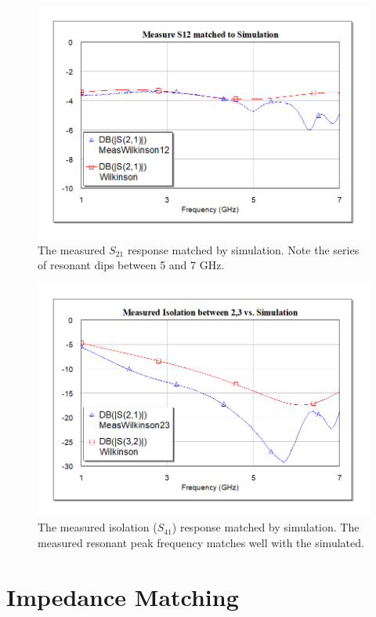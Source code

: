 \documentclass[twocolumn, aps, apl]{revtex4-1}
\begin{document}
\begin{figure}[!htbp]
    \centering
    \includegraphics[scale=0.4]{WilkinsonThro.png}
    \caption{The measured $S_{21}$ response matched by simulation. Note the series of resonant dips between 5 and 7 GHz. }
    \label{fig:wilkthro}
\end{figure}

\begin{figure}[!htbp]
    \centering
    \includegraphics[scale=0.4]{WilkinsonIso.png}
    \caption{The measured isolation ($S_{41}$) response matched by simulation. The measured resonant peak frequency matches well with the simulated. }
    \label{fig:wilkiso}
\end{figure}

\FloatBarrier

\section*{Impedance Matching}\label{sec:ImpedanceMatching}
\end{document}
